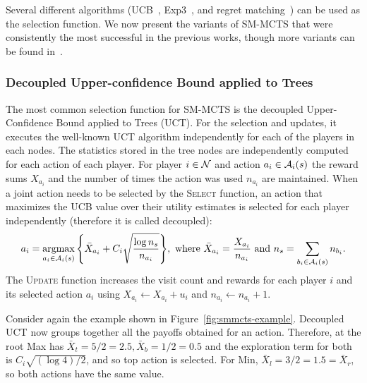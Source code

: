 Several different algorithms (\eg UCB~\cite{UCB}, Exp3~\cite{Auer2003Exp3}, and regret matching~\cite{Hart00}) can be used as the selection function.
We now present the variants of SM-MCTS that were consistently the most successful in the previous works,
though more variants can be found in~\cite{Perick12Comparison,Lanctot13Tron,Tak14smmcts}.

\subsubsection{Decoupled Upper-confidence Bound applied to Trees}\label{sec:duct}

The most common selection function for SM-MCTS is the decoupled Upper-Confidence Bound applied to Trees (UCT).
For the selection and updates, it executes the well-known UCT \cite{UCT} algorithm independently for each of the players in each nodes.
The statistics stored in the tree nodes are independently computed for each action of each player. For player $i\in \mathcal{N}$ and
action $a_i \in \mathcal{A}_i(s)$ the reward sums $X_{a_i}$ and the number of times the action was used $n_{a_i}$ are maintained.
When a joint action needs to be selected by the \textsc{Select} function, an action that maximizes the UCB value over
their utility estimates is selected for each player independently (therefore it is called decoupled):
\begin{equation}
a_i = \argmax_{a_i \in \cA_i(s)}{ \left\{ \bar{X}_{a_i} + C_i \sqrt{\frac{\log n_s}{n_{a_i}}} \right\} },
  \mbox{ where } \bar{X}_{a_i} = \frac{X_{a_i}}{n_{a_i}} \mbox{ and } n_s=\sum_{b_i \in \cA_i(s)} n_{b_i}.\label{eq:uct}
\end{equation}
\noindent The \textsc{Update} function increases the visit count and rewards for each player $i$ and its selected action $a_i$ using $X_{a_i} \leftarrow X_{a_i} + u_i$
and $n_{a_i} \leftarrow n_{a_i} + 1$.

Consider again the example shown in Figure~\ref{fig:smmcts-example}. Decoupled UCT now groups together all the payoffs obtained
for an action. Therefore, at the root Max has $\bar{X}_t = 5/2 = 2.5, \bar{X}_b = 1/2 = 0.5$ and the exploration term for both is
$C_i \sqrt{(\log 4) / 2}$, and so top action is selected. For Min, $\bar{X}_l = 3/2 = 1.5 = \bar{X}_r$, so both actions have the same value.


